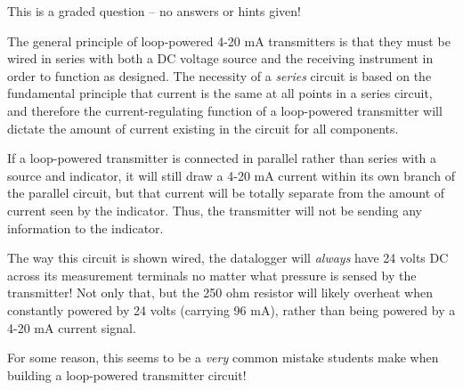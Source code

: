 \vfil 

\eject






This is a graded question -- no answers or hints given!







The general principle of loop-powered 4-20 mA transmitters is that they must be wired in series with both a DC voltage source and the receiving instrument in order to function as designed.  The necessity of a {\it series} circuit is based on the fundamental principle that current is the same at all points in a series circuit, and therefore the current-regulating function of a loop-powered transmitter will dictate the amount of current existing in the circuit for all components.

If a loop-powered transmitter is connected in parallel rather than series with a source and indicator, it will still draw a 4-20 mA current within its own branch of the parallel circuit, but that current will be totally separate from the amount of current seen by the indicator.  Thus, the transmitter will not be sending any information to the indicator.

\vskip 10pt

The way this circuit is shown wired, the datalogger will {\it always} have 24 volts DC across its measurement terminals no matter what pressure is sensed by the transmitter!  Not only that, but the 250 ohm resistor will likely overheat when constantly powered by 24 volts (carrying 96 mA), rather than being powered by a 4-20 mA current signal.

\vskip 10pt

For some reason, this seems to be a {\it very} common mistake students make when building a loop-powered transmitter circuit!





